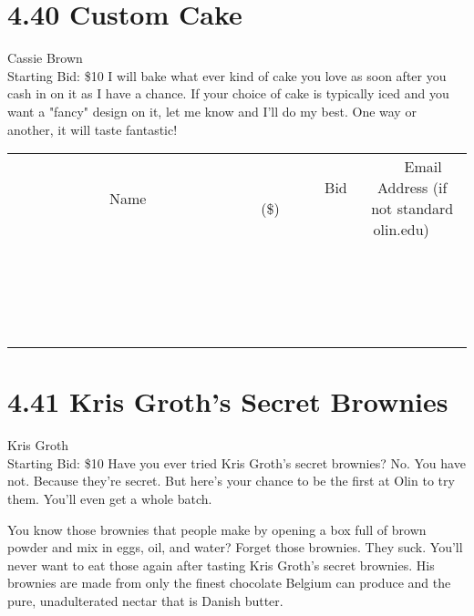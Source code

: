 \documentclass[11pt]{article}
\begin{document}
\section*{4.40 Custom Cake}
Cassie Brown
\\
Starting Bid: \$10
\newline
I will bake what ever kind of cake you love as soon after you cash in on it as I have a chance. If your choice of cake is typically iced and you want a "fancy" design on it, let me know and I'll do my best. One way or another, it will taste fantastic!
\\[3ex]
\begin{tabular}{c c c}
~~~~~~~~~~~~~Name~~~~~~~~~~~~~ & ~~~~~~~~~Bid (\$)~~~~~~~~~  & ~~~Email Address (if not standard olin.edu)~~~\\
 & & \\
\hline
 & & \\
\hline
 & & \\
\hline
 & & \\
\hline
 & & \\
\hline
 & & \\
\hline
 & & \\
\hline
 & & \\
\hline
 & & \\
\hline
 & & \\
\hline
 & & \\
\hline
 & & \\
\hline
 & & \\
\hline
 & & \\
\hline
 & & \\
\hline
 & & \\
\hline
 & & \\
\hline
 & & \\
\hline
 & & \\
\hline
\end{tabular}
\newpage
\section*{4.41 Kris Groth's Secret Brownies}
Kris Groth
\\
Starting Bid: \$10
\newline
Have you ever tried Kris Groth's secret brownies? No. You have not. Because they're secret. But here's your chance to be the first at Olin to try them. You'll even get a whole batch. 

You know those brownies that people make by opening a box full of brown powder and mix in eggs, oil, and water? Forget those brownies. They suck. You'll never want to eat those again after tasting Kris Groth's secret brownies. His brownies are made from only the finest chocolate Belgium can produce and the pure, unadulterated nectar that is Danish butter.
\end{document}
